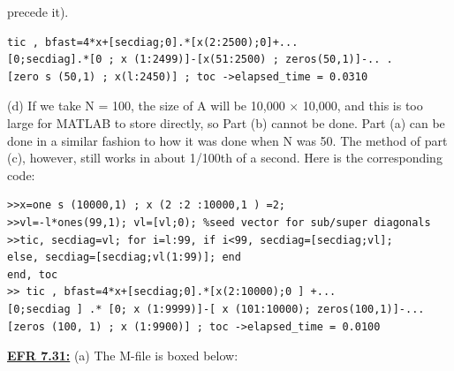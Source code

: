 \documentclass[../main.tex]{subfiles}
\begin{document}
precede it). 
\begin{lstlisting}[numbers=none,frame=none]
tic , bfast=4*x+[secdiag;0].*[x(2:2500);0]+... 
[0;secdiag].*[0 ; x (1:2499)]-[x(51:2500) ; zeros(50,1)]-.. . 
[zero s (50,1) ; x(l:2450)] ; toc ->elapsed_time = 0.0310
\end{lstlisting}
(d) If we take N = 100, the size of A will be 10,000 $\times$ 10,000, and this is too large for MATLAB to 
store directly, so Part (b) cannot be done. Part (a) can be done in a similar fashion to how it was done 
when N was 50. The method of part (c), however, still works in about 1/100th of a second. Here is the 
corresponding code:
\begin{lstlisting}[numbers=none,frame=none]
>>x=one s (10000,1) ; x (2 :2 :10000,1 ) =2; 
>>vl=-l*ones(99,1); vl=[vl;0); %seed vector for sub/super diagonals 
>>tic, secdiag=vl; for i=l:99, if i<99, secdiag=[secdiag;vl]; 
else, secdiag=[secdiag;vl(1:99)]; end 
end, toc 
>> tic , bfast=4*x+[secdiag;0].*[x(2:10000);0 ] +... 
[0;secdiag ] .* [0; x (1:9999)]-[ x (101:10000); zeros(100,1)]-... 
[zeros (100, 1) ; x (1:9900)] ; toc ->elapsed_time = 0.0100
\end{lstlisting}
\textbf{\underline{EFR 7.31:}} (a) The M-file is boxed below: 
\end{document}
